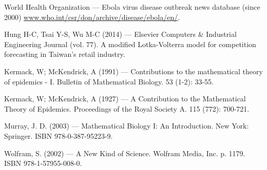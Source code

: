 %
%
% 
% 
%

\begin{thebibliography}{99.}

 World Health Organization --- Ebola virus disease outbreak news database (since 2000) 
\url{www.who.int/csr/don/archive/disease/ebola/en/}.

 Hung H-C, Tsai Y-S, Wu M-C (2014) --- Elsevier Computers \& Industrial Engineering 
Journal (vol. 77). A modified Lotka-Volterra model for competition forecasting in Taiwan's retail industry.

 Kermack, W; McKendrick, A (1991) --- Contributions to the mathematical theory of epidemics - I. Bulletin of Mathematical Biology. 53 (1-2): 33-55.

 Kermack, W; McKendrick, A (1927) --- A Contribution to the Mathematical Theory of Epidemics. Proceedings of the Royal Society A. 115 (772): 700-721.

 Murray, J. D. (2003) --- Mathematical Biology I: An Introduction. 
New York: Springer. ISBN 978-0-387-95223-9.

 Wolfram, S. (2002) --- A New Kind of Science. 
Wolfram Media, Inc. p. 1179. ISBN 978-1-57955-008-0.

\end{thebibliography}
